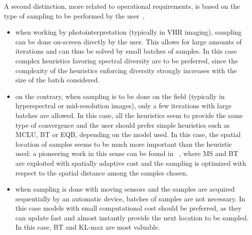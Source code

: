 A second distinction, more related to operational requirements, is based on the type of sampling to be performed by the user~, 
\begin{itemize}
\item[-] when working by photointerpretation (typically in VHR imaging), sampling can be done on-screen directly by the user. This allows for large amounts of iterations and can thus be solved by small batches of samples. In this case complex heuristics favoring spectral diversity are to be preferred, since the complexity of the heuristics enforcing diversity strongly increases with the size of the batch considered. 
\item[-] on the contrary, when sampling is to be done on the field (typically in hyperspectral or mid-resolution images), only a few iterations with large batches are allowed. In this case, all the heuristics seem to provide the same type of convergence and the user should prefer simple heuristics such as MCLU, BT or EQB, depending on the model used. In this case, the spatial location of samples seems to be much more important than the heuristic used: a pioneering work in this sense can be found in ~, where MS and BT are exploited with spatially adaptive cost and the sampling is optimized with respect to the spatial distance among the samples chosen.
\item[-] when sampling is done with moving sensors and the samples are acquired sequentially by an automatic device, batches of samples are not necessary. In this case models with small computational cost should be preferred, as they can update fast and almost instantly provide the next location to be sampled. In this case, BT and KL-max are most valuable. 
\end{itemize}
